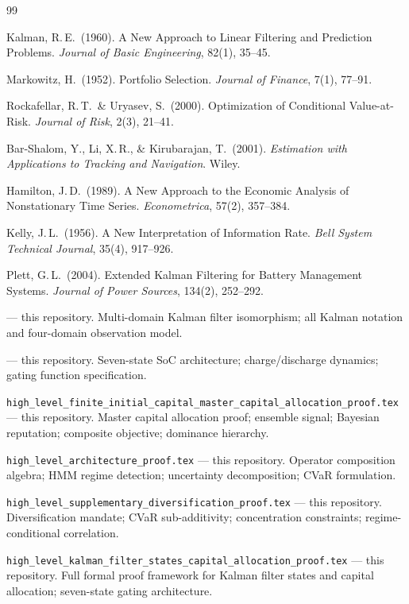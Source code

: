 \documentclass[12pt,openany]{book}
\numberwithin{equation}{chapter}
\theoremstyle{plain}
\theoremstyle{definition}
\theoremstyle{remark}
\begin{document}
\begin{thebibliography}{99}

Kalman, R.\,E.\ (1960).
A New Approach to Linear Filtering and Prediction Problems.
\textit{Journal of Basic Engineering}, 82(1), 35--45.

Markowitz, H.\ (1952).
Portfolio Selection.
\textit{Journal of Finance}, 7(1), 77--91.

Rockafellar, R.\,T.\ \& Uryasev, S.\ (2000).
Optimization of Conditional Value-at-Risk.
\textit{Journal of Risk}, 2(3), 21--41.

Bar-Shalom, Y., Li, X.\,R., \& Kirubarajan, T.\ (2001).
\textit{Estimation with Applications to Tracking and Navigation}.
Wiley.

Hamilton, J.\,D.\ (1989).
A New Approach to the Economic Analysis of Nonstationary Time Series.
\textit{Econometrica}, 57(2), 357--384.

Kelly, J.\,L.\ (1956).
A New Interpretation of Information Rate.
\textit{Bell System Technical Journal}, 35(4), 917--926.

Plett, G.\,L.\ (2004).
Extended Kalman Filtering for Battery Management Systems.
\textit{Journal of Power Sources}, 134(2), 252--292.

--- this repository.
Multi-domain Kalman filter isomorphism; all Kalman notation and
four-domain observation model.

--- this repository.
Seven-state SoC architecture; charge/discharge dynamics;
gating function specification.

\texttt{high\_level\_finite\_initial\_capital\_master\_capital\_allocation\_proof.tex}
--- this repository.
Master capital allocation proof; ensemble signal; Bayesian
reputation; composite objective; dominance hierarchy.

\texttt{high\_level\_architecture\_proof.tex} --- this repository.
Operator composition algebra; HMM regime detection; uncertainty
decomposition; CVaR formulation.

\texttt{high\_level\_supplementary\_diversification\_proof.tex}
--- this repository.
Diversification mandate; CVaR sub-additivity; concentration
constraints; regime-conditional correlation.

\texttt{high\_level\_kalman\_filter\_states\_capital\_allocation\_proof.tex}
--- this repository.
Full formal proof framework for Kalman filter states and capital
allocation; seven-state gating architecture.

\end{thebibliography}
\end{document}
